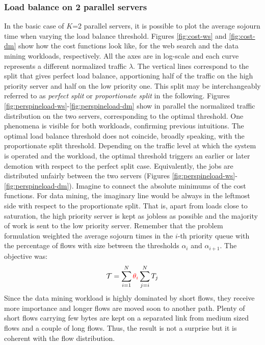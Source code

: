 \subsubsection{Load balance on 2 parallel servers}
\label{sec:load-balance-2-servers}
In the basic case of $K$=2 parallel servers, it is possible to plot the average sojourn time when varying the load balance threshold. Figures \ref{fig:cost-ws} and \ref{fig:cost-dm} show how the cost functions look like, for the web search and the data mining workloads, respectively. All the axes are in log-scale and each curve represents a different normalized traffic $\lambda$. The vertical lines correspond to the split that gives perfect load balance, apportioning half of the traffic on the high priority server and half on the low priority one. This split may be interchangeably referred to as \emph{perfect split} or \emph{proportionate split} in the following. Figures \ref{fig:perspineload-ws}-\ref{fig:perspineload-dm} show in parallel the normalized traffic distribution on the two servers, corresponding to the optimal threshold. One phenomena is visible for both workloads, confirming previous intuitions. The optimal load balance threshold does not coincide, broadly speaking, with the proportionate split threshold. Depending on the traffic level at which the system is operated and the workload, the optimal threshold triggers an earlier or later demotion with respect to the perfect split case. Equivalently, the jobs are distributed unfairly between the two servers (Figures \ref{fig:perspineload-ws}-\ref{fig:perspineload-dm}). Imagine to connect the absolute minimums of the cost functions. For data mining, the imaginary line would be always in the leftmost side with respect to the proportionate split. That is, apart from loads close to saturation, the high priority server is kept as jobless as possible and the majority of work is sent to the low priority server. Remember that the problem formulation weighted the average sojourn times in the $i$-th priority queue with the percentage of flows with size between the thresholds $\alpha_{i}$ and $\alpha_{i+1}$. The objective was:
\[
\mathcal{T} = \sum_{i=1}^{N}\textcolor{red}{\theta_i} \sum_{j=i}^{N}T_j
\]
Since the data mining workload is highly dominated by short flows, they receive more importance and longer flows are moved soon to another path. Plenty of short flows carrying few bytes are kept on a separated link from medium sized flows and a couple of long flows. Thus, the result is not a surprise but it is coherent with the flow distribution. \\
